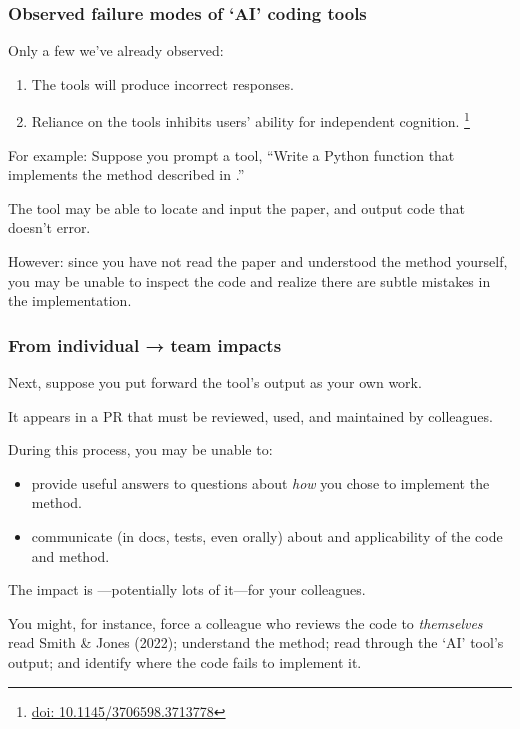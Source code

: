 \documentclass[12pt,aspectratio=169]{beamer}
\begin{document}
\begin{frame}
\frametitle{Observed failure modes of ‘AI’ coding tools}

Only a few we've already observed:

\begin{enumerate}
  \item The tools will  produce incorrect responses.
  \item Reliance on the tools inhibits users' ability for independent cognition.%
    \footnote{\href{https://doi.org/10.1145/3706598.3713778}{doi: 10.1145/3706598.3713778}}
\end{enumerate}

\bigskip
For example: Suppose you prompt a tool, “Write a Python function that implements the method described in .”

\medskip
The tool may be able to locate and input the paper, and output code that doesn't error.

\medskip
However: since you have not read the paper
and understood the method yourself,
you may be unable to inspect the code
and realize there are subtle mistakes in the implementation.
\end{frame}

\begin{frame}
\frametitle{From individual → team impacts}

Next, suppose you put forward the tool's output as your own work.

It appears in a PR that must be reviewed, used, and maintained by colleagues.

\medskip
During this process, you may be unable to:
\begin{itemize}
  \item provide useful answers to questions about \emph{how} you chose to implement the method.
  \item communicate (in docs, tests, even orally) about  and applicability of the code and method.
\end{itemize}

\medskip
The impact is —potentially lots of it—for your colleagues.

\medskip
You might, for instance, force a colleague who reviews the code to \emph{themselves} read Smith \& Jones (2022);
understand the method;
read through the ‘AI’ tool's output;
and identify where the code fails to implement it.
\end{frame}
\end{document}
